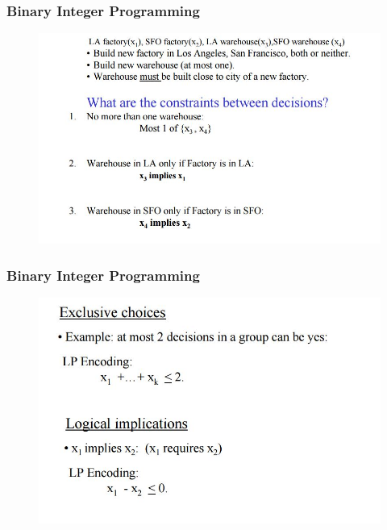 \documentclass{beamer}
\begin{document}
\begin{frame}
	\frametitle{Binary Integer Programming}
	\large
	\begin{figure}
		\centering
		\includegraphics[width=1.1\linewidth]{calaircraft5}
	\end{figure}
\end{frame}
\begin{frame}
	\frametitle{Binary Integer Programming}
	\large
	\begin{figure}
		\centering
		\includegraphics[width=1.1\linewidth]{calaircraft6}
	\end{figure}
\end{frame}
\end{document}

